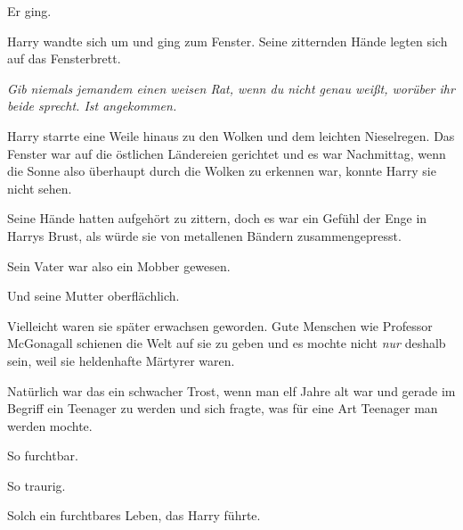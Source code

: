 Er ging.

Harry wandte sich um und ging zum Fenster. Seine zitternden Hände legten sich auf das Fensterbrett.

\emph{Gib niemals jemandem einen weisen Rat, wenn du nicht genau weißt, worüber ihr beide sprecht. Ist angekommen.}

Harry starrte eine Weile hinaus zu den Wolken und dem leichten Nieselregen. Das Fenster war auf die östlichen Ländereien gerichtet und es war Nachmittag, wenn die Sonne also überhaupt durch die Wolken zu erkennen war, konnte Harry sie nicht sehen.

Seine Hände hatten aufgehört zu zittern, doch es war ein Gefühl der Enge in Harrys Brust, als würde sie von metallenen Bändern zusammengepresst.

Sein Vater war also ein Mobber gewesen.

Und seine Mutter oberflächlich.

Vielleicht waren sie später erwachsen geworden. Gute Menschen wie Professor McGonagall schienen die Welt auf sie zu geben und es mochte nicht \emph{nur} deshalb sein, weil sie heldenhafte Märtyrer waren.

Natürlich war das ein schwacher Trost, wenn man elf Jahre alt war und gerade im Begriff ein Teenager zu werden und sich fragte, was für eine Art Teenager man werden mochte.

So furchtbar.

So traurig.

Solch ein furchtbares Leben, das Harry führte.

